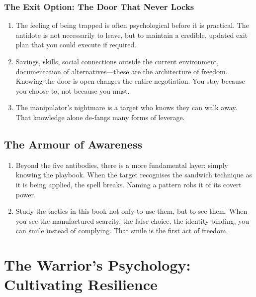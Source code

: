 \documentclass[12pt,a4paper,oneside]{book}
\begin{document}
\subsection{The Exit Option: The Door That Never Locks}
\begin{enumerate}[leftmargin=*, label=\arabic*.]
\item The feeling of being trapped is often psychological before it is practical. The antidote is not necessarily to leave, but to maintain a credible, updated exit plan that you could execute if required.
\item Savings, skills, social connections outside the current environment, documentation of alternatives—these are the architecture of freedom. Knowing the door is open changes the entire negotiation. You stay because you choose to, not because you must.
\item The manipulator's nightmare is a target who knows they can walk away. That knowledge alone de-fangs many forms of leverage.
\end{enumerate}

\section{The Armour of Awareness}
\begin{enumerate}[leftmargin=*, label=\arabic*.]
\item Beyond the five antibodies, there is a more fundamental layer: simply knowing the playbook. When the target recognises the sandwich technique as it is being applied, the spell breaks. Naming a pattern robs it of its covert power.
\item Study the tactics in this book not only to use them, but to see them. When you see the manufactured scarcity, the false choice, the identity binding, you can smile instead of complying. That smile is the first act of freedom.
\end{enumerate}

\chapter{The Warrior's Psychology: Cultivating Resilience}
\end{document}
